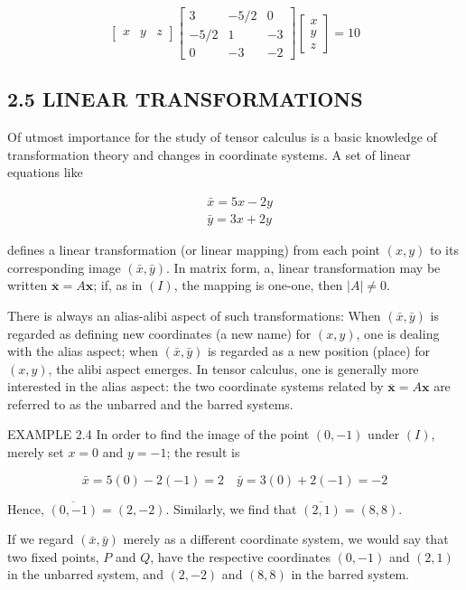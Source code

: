 \documentclass[10pt]{article}
\begin{document}
$$
\left[\begin{array}{lll}
x & y & z
\end{array}\right]\left[\begin{array}{ccc}
3 & -5 / 2 & 0 \\
-5 / 2 & 1 & -3 \\
0 & -3 & -2
\end{array}\right]\left[\begin{array}{l}
x \\
y \\
z
\end{array}\right]=10
$$

\subsection*{2.5 LINEAR TRANSFORMATIONS}
Of utmost importance for the study of tensor calculus is a basic knowledge of transformation theory and changes in coordinate systems. A set of linear equations like


\begin{align*}
& \bar{x}=5 x-2 y \\
& \bar{y}=3 x+2 y \tag{I}
\end{align*}


defines a linear transformation (or linear mapping) from each point $(x, y)$ to its corresponding image $(\bar{x}, \bar{y})$. In matrix form, a, linear transformation may be written $\overline{\mathbf{x}}=A \mathbf{x}$; if, as in $(I)$, the mapping is one-one, then $|A| \neq 0$.

There is always an alias-alibi aspect of such transformations: When $(\bar{x}, \bar{y})$ is regarded as defining new coordinates (a new name) for $(x, y)$, one is dealing with the alias aspect; when $(\bar{x}, \bar{y})$ is regarded as a new position (place) for $(x, y)$, the alibi aspect emerges. In tensor calculus, one is generally more interested in the alias aspect: the two coordinate systems related by $\overline{\mathbf{x}}=A \mathbf{x}$ are referred to as the unbarred and the barred systems.

EXAMPLE 2.4 In order to find the image of the point $(0,-1)$ under $(I)$, merely set $x=0$ and $y=-1$; the result is

$$
\bar{x}=5(0)-2(-1)=2 \quad \bar{y}=3(0)+2(-1)=-2
$$

Hence, $\overline{(0,-1)}=(2,-2)$. Similarly, we find that $\overline{(2,1)}=(8,8)$.

If we regard $(\bar{x}, \bar{y})$ merely as a different coordinate system, we would say that two fixed points, $P$ and $Q$, have the respective coordinates $(0,-1)$ and $(2,1)$ in the unbarred system, and $(2,-2)$ and $(8,8)$ in the barred system.
\end{document}

